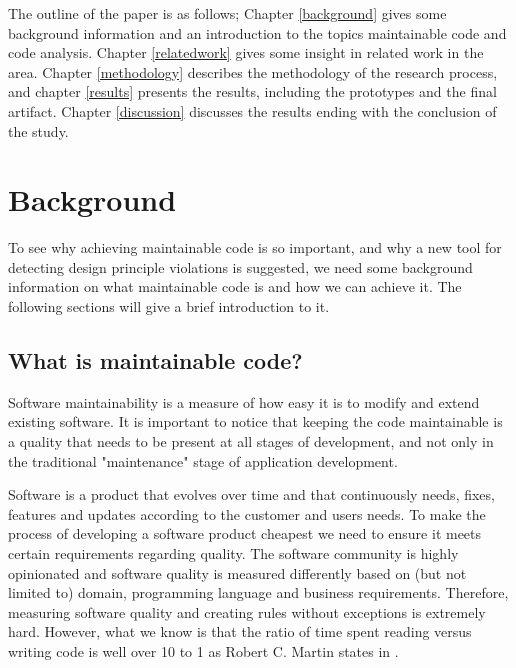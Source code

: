 \documentclass{report}
\begin{document}


The outline of the paper is as follows; Chapter \ref{background} gives some background information and an introduction to the topics maintainable code and code analysis. Chapter \ref{relatedwork} gives some insight in related work in the area. Chapter \ref{methodology} describes the methodology of the research process, and chapter \ref{results} presents the results, including the prototypes and the final artifact. Chapter \ref{discussion} discusses the results ending with the conclusion of the study.  

\chapter{Background}
\label{background}
To see why achieving maintainable code is so important, and why a new tool for detecting design principle violations is suggested, we need some background information on what maintainable code is and how we can achieve it. The following sections will give a brief introduction to it.

\section{What is maintainable code?}
Software maintainability is a measure of how easy it is to modify and extend existing software. It is important to notice that keeping the code maintainable is a quality that needs to be present at all stages of development, and not only in the traditional "maintenance" stage of application development.  

Software is a product that evolves over time and that continuously needs, fixes, features and updates according to the customer and users needs. To make the process of developing a software product cheapest we need to ensure it meets certain requirements regarding quality. The software community is highly opinionated and software quality is measured differently based on (but not limited to) domain, programming language and business requirements. Therefore, measuring software quality and creating rules without exceptions is extremely hard. However, what we know is that the ratio of time spent reading versus writing code is well over 10 to 1 as Robert C. Martin states in \cite{Martin:2008:CCH:1388398}.
\end{document}
